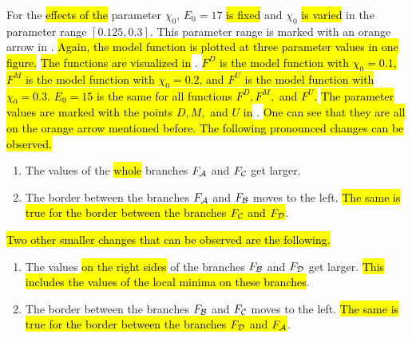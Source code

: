 For the \hl{effects of the} parameter $\chi_0$, $E_0 = 17$ \hl{is fixed} and $\chi_0$ \hl{is varied} in the parameter range $[0.125, 0.3]$.
This parameter range is marked with an orange arrow in .
\hl{
	Again, the model function is plotted at three parameter values in one figure.
}
\hl{The functions are visualized in} .
\hl{
	$F^D$ is the model function with $\chi_0 = 0.1$, $F^M$ is the model function with $\chi_0 = 0.2$, and $F^U$ is the model function with $\chi_0 = 0.3$.
	$E_0 = 15$ is the same for all functions $F^D, F^M,$ and $F^U$.
}
\hl{The parameter values are marked with the points $D, M,$ and $U$ in} .
\hl{
	One can see that they are all on the orange arrow mentioned before.
	The following pronounced changes can be observed.
}
\begin{enumerate}
	\item The values of the \hl{whole} branches $F_{\mathcal{A}}$ and $F_{\mathcal{C}}$ get larger.
	\item The border between the branches $F_{\mathcal{A}}$ and $F_{\mathcal{B}}$ moves to the left.
	      \hl{The same is true for the border between the branches $F_{\mathcal{C}}$ and $F_{\mathcal{D}}$}.
\end{enumerate}
\hl{
	Two other smaller changes that can be observed are the following.
}
\begin{enumerate}
	\item The values \hl{on the right sides} of the branches $F_{\mathcal{B}}$ and $F_{\mathcal{D}}$ get larger.
	      \hl{This includes the values of the local minima on these branches}.
	\item The border between the branches $F_{\mathcal{B}}$ and $F_{\mathcal{C}}$ moves to the left.
	      \hl{The same is true for the border between the branches $F_{\mathcal{D}}$ and $F_{\mathcal{A}}$}.
\end{enumerate}


